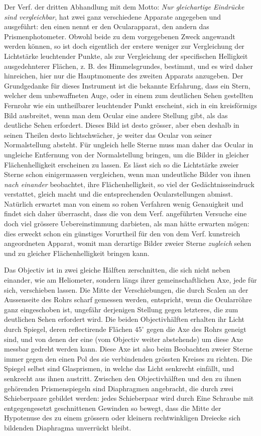Der Verf. der dritten Abhandlung mit dem Motto: \emph{Nur gleichartige Eindrücke sind vergleichbar}, hat zwei ganz verschiedene Apparate angegeben und ausgeführt: den einen nennt er den Ocularapparat, den andern das Prismenphotometer. Obwohl beide zu dem vorgegebenen Zweck angewandt werden können, so ist doch eigentlich der erstere weniger zur Vergleichung der Lichtstärke leuchtender Punkte, als zur Vergleichung der specifischen Helligkeit ausgedehnterer Flächen, z. B. des Himmelsgrundes, bestimmt, und es wird daher hinreichen, hier nur die Hauptmomente des zweiten Apparats anzugeben. Der Grundgedanke für dieses Instrument ist die bekannte Erfahrung, dass ein Stern, welcher dem unbewaffneten Auge, oder in einem zum deutlichen Sehen gestellten Fernrohr wie ein untheilbarer leuchtender Punkt erscheint, sich in ein kreisförmigs Bild ausbreitet, wenn man dem Ocular eine andere Stellung gibt, als das deutliche Sehen erfordert. Dieses Bild ist desto grösser, aber eben deshalb in seinen Theilen desto lichtschwächer, je weiter das Ocular von seiner Normalstellung absteht. Für ungleich helle Sterne muss man daher das Ocular in ungleiche Entfernung von der Normalstellung bringen, um die Bilder in gleicher Flächenhelligkeit erscheinen zu lassen. Es lässt sich so die Lichtstärke zweier Sterne schon einigermassen vergleichen, wenn man undeutliche Bilder von ihnen \emph{nach einander} beobachtet, ihre Flächenhelligkeit, so viel der Gedächtnisseindruck verstattet, gleich macht und die entsprechenden Ocularstellungen abmisst. Natürlich erwartet man von einem so rohen Verfahren wenig Genauigkeit und findet sich daher überrascht, dass die von dem Verf. angeführten Versuche eine doch viel grössere Uebereinstimmung darbieten, als man hätte erwarten mögen: dies erweckt schon ein günstiges Vorurtheil für den von dem Verf. kunstreich angeordneten Apparat, womit man derartige Bilder zweier Sterne \emph{zugleich} sehen und zu gleicher Flächenhelligkeit bringen kann.

Das Objectiv ist in zwei gleiche Hälften zerschnitten, die sich nicht neben einander, wie am Heliometer, sondern längs ihrer gemeinschaftlichen Axe, jede für sich, verschieben lassen. Die Mitte der Verschiebungen, die durch Scalen an der Aussenseite des Rohrs scharf gemessen werden, entspricht, wenn die Ocularröhre ganz eingeschoben ist, ungefähr derjenigen Stellung gegen letzteres, die zum deutlichen Sehen erfordert wird. Die beiden Objectivhälften erhalten ihr Licht durch Spiegel, deren reflectirende Flächen $45^\circ$ gegen die Axe des Rohrs geneigt sind, und von denen der eine (vom Objectiv weiter abstehende) um diese Axe messbar gedreht werden kann. Diese Axe ist also beim Beobachten zweier Sterne immer gegen den einen Pol des sie verbindenden grössten Kreises zu richten. Die Spiegel selbst sind Glasprismen, in welche das Licht senkrecht einfällt, und senkrecht aus ihnen
austritt. Zwischen den Objectivhälften und den zu ihnen gehörenden Prismenspiegeln sind
Diaphragmen angebracht, die durch zwei Schieberpaare gebildet werden: jedes Schieberpaar wird
durch Eine Schraube mit entgegengesetzt geschnittenen Gewinden so bewegt, dass die Mitte der
Hypotenuse des zu einem grössern oder kleinern rechtwinkligen Dreiecke sich bildenden Diaphragma
unverrückt bleibt.

